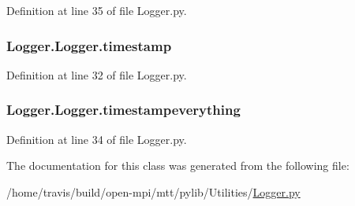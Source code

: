 Definition at line 35 of file Logger.\-py.

\hypertarget{class_logger_1_1_logger_af1d68b73fec8eebd0abeafa3bc8fd98b}{
\subsubsection[{timestamp}]{\setlength{\rightskip}{0pt plus 5cm}Logger.\-Logger.\-timestamp}}\label{class_logger_1_1_logger_af1d68b73fec8eebd0abeafa3bc8fd98b}


Definition at line 32 of file Logger.\-py.

\hypertarget{class_logger_1_1_logger_a6012f50ab21e5ab3b89465a972b6a99d}{
\subsubsection[{timestampeverything}]{\setlength{\rightskip}{0pt plus 5cm}Logger.\-Logger.\-timestampeverything}}\label{class_logger_1_1_logger_a6012f50ab21e5ab3b89465a972b6a99d}


Definition at line 34 of file Logger.\-py.



The documentation for this class was generated from the following file\-:\begin{DoxyCompactItemize}
\item 
/home/travis/build/open-\/mpi/mtt/pylib/\-Utilities/\hyperlink{_logger_8py}{Logger.\-py}\end{DoxyCompactItemize}
